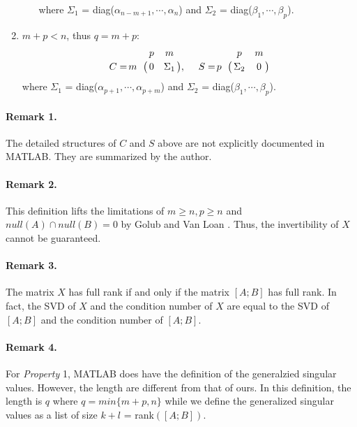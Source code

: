\begin{enumerate}
\begin{enumerate}
                        where $\Sigma_1$ = diag($\alpha_{n-m+1}, \cdots, \alpha_{n}$) and $\Sigma_2$ = diag($\beta_1, \cdots, \beta_p$).
                \end{enumerate}
            \item $m + p < n$, thus $q = m+p$:
                \begin{displaymath}
                    C = \bordermatrix{ & p & m   \cr
                    \hfill m & 0 & \Sigma_1}, \  \ \ \
                    S = \bordermatrix{ & p & m   \cr
                    \hfill p & \Sigma_2 & 0}
                \end{displaymath}
                where $\Sigma_1$ = diag($\alpha_{p+1}, \cdots, \alpha_{p+m}$) and $\Sigma_2$ = diag($\beta_1, \cdots, \beta_p$).
        \end{enumerate}
        
        \paragraph{Remark 1.}
            The detailed structures of $C$ and $S$ above are not explicitly documented in MATLAB. They are summarized by the author.
            
        \paragraph{Remark 2.}
            This definition lifts the limitations of $m \geq n, p \geq n $ and $null(A) \cap null(B) = {0}$ by Golub and Van Loan \cite[pp.~466]{10.5555/248979}. Thus, the invertibility of $X$ cannot be guaranteed. 
        
        \paragraph{Remark 3.}
            The matrix $X$ has full rank if and only if the matrix $[A;  B]$ has full rank. In fact, the SVD of $X$ and the condition number of $X$ are equal to the SVD of $[A; B]$ and the condition number of $[A; B]$. 
        
        \paragraph{Remark 4.}
            For \textit{Property} 1, MATLAB does have the definition of the generalzied singular values. However, the length are different from that of ours. In this definition, the length is $q$ where $q = min\{m + p, n\}$ while we define the generalized singular values as a list of size $k+l$ = rank$([A; B])$.
            
